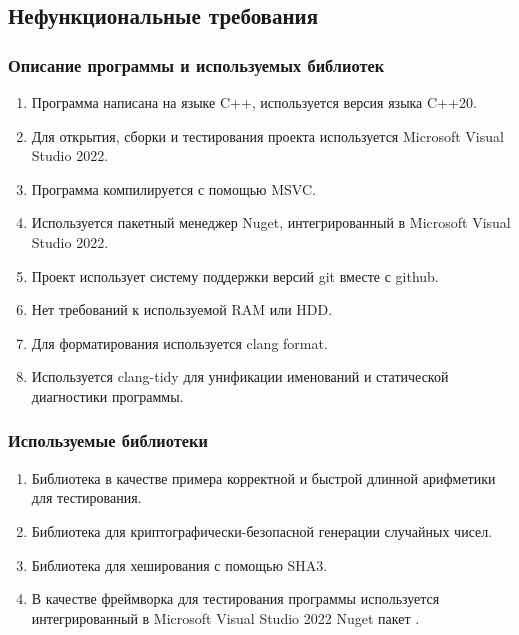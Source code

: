 \documentclass{article}
\begin{document}
\subsection{Нефункциональные требования}
\subsubsection{Описание программы и используемых библиотек}
\begin{enumerate}
  \item Программа написана на языке C++, используется версия языка C++20.
  \item Для открытия, сборки и тестирования проекта используется Microsoft Visual Studio 2022.
  \item Программа компилируется с помощью MSVC.
  \item Используется пакетный менеджер Nuget, интегрированный в Microsoft Visual Studio 2022.
  \item Проект использует систему поддержки версий git вместе с github.
  \item Нет требований к используемой RAM или HDD.
  \item Для форматирования используется clang format.
  \item Используется clang-tidy для унификации именований и статической диагностики программы.
\end{enumerate}
\subsubsection{Используемые библиотеки}
\begin{enumerate}
  \item Библиотека \cite{boostmultiprecision} в качестве примера корректной и быстрой длинной арифметики для тестирования.
  \item Библиотека \cite{random} для криптографически-безопасной генерации случайных чисел.
  \item Библиотека \cite{hash} для хеширования с помощью SHA3.
  \item В качестве фреймворка для тестирования программы используется интегрированный в Microsoft Visual Studio 2022 Nuget пакет \cite{googletestnuget}.
\end{enumerate}
\end{document}
